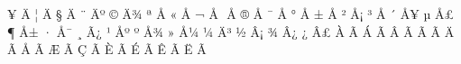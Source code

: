 \mubyte ^^a5 ^^c4^^9b\endmubyte %
\mubyte ^^a6 ^^c4^^99\endmubyte %
\mubyte ^^a7 ^^c4^^9f\endmubyte %
\mubyte ^^a8 ^^c4^^ba\endmubyte %
\mubyte ^^a9 ^^c4^^be\endmubyte %
\mubyte ^^aa ^^c5^^82\endmubyte %
\mubyte ^^ab ^^c5^^84\endmubyte %
\mubyte ^^ac ^^c5^^88\endmubyte %
\mubyte ^^ad ^^c5^^8b\endmubyte %
\mubyte ^^ae ^^c5^^91\endmubyte %
\mubyte ^^af ^^c5^^95\endmubyte %
\mubyte ^^b0 ^^c5^^99\endmubyte %
\mubyte ^^b1 ^^c5^^9b\endmubyte %
\mubyte ^^b2 ^^c5^^a1\endmubyte %
\mubyte ^^b3 ^^c5^^9f\endmubyte %
\mubyte ^^b4 ^^c5^^a5\endmubyte %
\mubyte ^^b5 ^^c5^^a3\endmubyte %
\mubyte ^^b6 ^^c5^^b1\endmubyte %
\mubyte ^^b7 ^^c5^^af\endmubyte %
\mubyte ^^b8 ^^c3^^bf\endmubyte %
\mubyte ^^b9 ^^c5^^ba\endmubyte %
\mubyte ^^ba ^^c5^^be\endmubyte %
\mubyte ^^bb ^^c5^^bc\endmubyte %
\mubyte ^^bc ^^c4^^b3\endmubyte %
\mubyte ^^bd ^^c2^^a1\endmubyte %
\mubyte ^^be ^^c2^^bf\endmubyte %
\mubyte ^^bf ^^c2^^a3\endmubyte %
\mubyte ^^c0 ^^c3^^80\endmubyte %
\mubyte ^^c1 ^^c3^^81\endmubyte %
\mubyte ^^c2 ^^c3^^82\endmubyte %
\mubyte ^^c3 ^^c3^^83\endmubyte %
\mubyte ^^c4 ^^c3^^84\endmubyte %
\mubyte ^^c5 ^^c3^^85\endmubyte %
\mubyte ^^c6 ^^c3^^86\endmubyte %
\mubyte ^^c7 ^^c3^^87\endmubyte %
\mubyte ^^c8 ^^c3^^88\endmubyte %
\mubyte ^^c9 ^^c3^^89\endmubyte %
\mubyte ^^ca ^^c3^^8a\endmubyte %
\mubyte ^^cb ^^c3^^8b\endmubyte %
